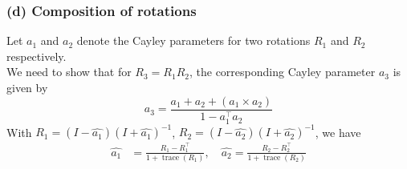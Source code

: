 \subsubsection*{(d) Composition of rotations}

Let \( a_{1} \) and \( a_{2} \) denote the Cayley parameters for two rotations \( R_{1} \) and \( R_{2} \) respectively. \\
We need to show that for \( R_{3}=R_{1} R_{2} \), the corresponding Cayley parameter \( a_{3} \) is given by
\[
    a_{3}=\frac{a_{1}+a_{2}+\left(a_{1} \times a_{2}\right)}{1-a_{1}^{\top} a_{2}}
\]
With \( R_1 = (I - \widehat{a_1}) {(I + \widehat{a_1})}^{-1} \), \( R_2 = (I - \widehat{a_2}) {(I + \widehat{a_2})}^{-1} \), we have
\begin{align*}
    \widehat{a_1}
     & =
    \frac{R_1 - R_1^\top}{1+\operatorname{trace}(R_1)}
    , \quad
    \widehat{a_2}
    =
    \frac{R_2 - R_2^\top}{1+\operatorname{trace}(R_2)}
\end{align*}
